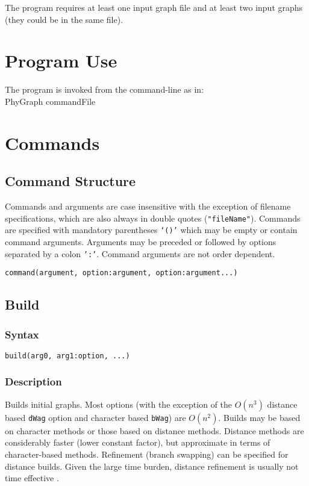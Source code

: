 \documentclass[11pt]{article}
\begin{document}
	

	
	The program requires at least one input graph file and at least two input graphs (they could be in the same file).

	
	\section{Program Use}
	The program is invoked from the command-line as in:\\
	PhyGraph commandFile\\
	
	\section{Commands}
		\subsection{Command Structure}
		Commands and arguments are case insensitive with the exception of filename specifications, which are also 
		always in double quotes (\texttt{"fileName"}).  Commands are specified with mandatory parentheses \texttt{`()'} which may be empty or
		contain command arguments. Arguments may be preceded or followed by options separated by a colon \texttt{':'}.  Command arguments are not 
		order dependent.
		
		\bigskip
		\texttt{command(argument, option:argument, option:argument...)}
	
	\subsection{Build}
		\subsubsection{Syntax}
		\texttt{build(arg0, arg1:option, ...)}
		\subsubsection{Description}
		Builds initial graphs.  Most options (with the exception of the $O(n^3)$ distance based \texttt{dWag} option and character based \texttt{bWag})
		are $O(n^2)$.  Builds may be based on character methods or those based on distance methods.  Distance methods are considerably faster 
		(lower constant factor), but approximate in terms of character-based methods.  Refinement (branch swapping) can be specified
		for distance builds.  Given the large time burden, distance refinement is usually not time effective \citep{Wheeler2021}.
\end{document}
